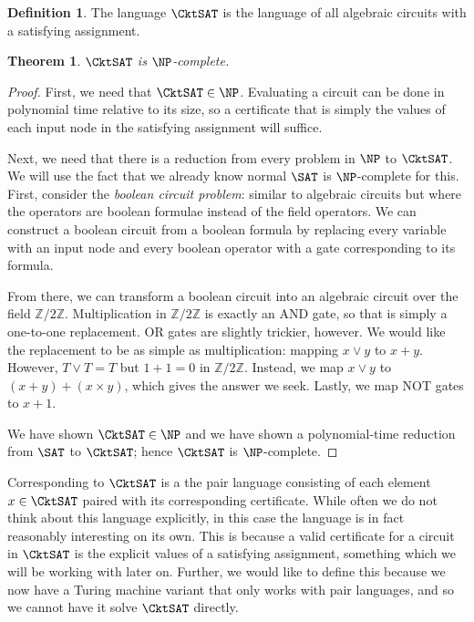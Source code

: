 \documentclass[english,12pt]{reedthesis}
\theoremstyle{plain}
\newtheorem{thm}{Theorem}[section]
\theoremstyle{definition}
\newtheorem{defn}[defn]{Definition}
\theoremstyle{remark}
\begin{document}
\begin{defn}\label{def:cktsat}
  The language $\CktSAT$ is the language of all algebraic circuits with a
  satisfying assignment.
\end{defn}

\begin{thm}\label{thm:cktsat-np-complete}
  $\CktSAT$ is $\NP$-complete.
\end{thm}

\begin{proof}
  First, we need that $\CktSAT \in \NP$. Evaluating a circuit can be done in
  polynomial time relative to its size, so a certificate that is simply the
  values of each input node in the satisfying assignment will suffice.

  Next, we need that there is a reduction from every problem in $\NP$ to
  $\CktSAT$. We will use the fact that we already know normal $\SAT$ is
  $\NP$-complete for this. First, consider the \emph{boolean circuit problem}:
  similar to algebraic circuits but where the operators are boolean formulae
  instead of the field operators. We can construct a boolean circuit from a
  boolean formula by replacing every variable with an input node and every
  boolean operator with a gate corresponding to its formula.

  From there, we can transform a boolean circuit into an algebraic circuit over
  the field $\mathbb{Z}/2\mathbb{Z}$. Multiplication in $\mathbb{Z}/2\mathbb{Z}$ is exactly an AND gate, so that is
  simply a one-to-one replacement. OR gates are slightly trickier, however. We
  would like the replacement to be as simple as multiplication: mapping $x \vee y$
  to $x + y$. However, $T \vee T = T$ but $1 + 1 = 0$ in $\mathbb{Z}/2\mathbb{Z}$. Instead, we map
  $x \vee y$ to $(x + y) + (x \times y)$, which gives the answer we seek. Lastly, we map
  NOT gates to $x + 1$.

  We have shown $\CktSAT \in \NP$ and we have shown a polynomial-time reduction
  from $\SAT$ to $\CktSAT$; hence $\CktSAT$ is $\NP$-complete.
\end{proof}

Corresponding to $\CktSAT$ is a the pair language consisting of each element
$x \in \CktSAT$ paired with its corresponding certificate. While often we do not
think about this language explicitly, in this case the language is in fact
reasonably interesting on its own. This is because a valid certificate for a
circuit in $\CktSAT$ is the explicit values of a satisfying assignment,
something which we will be working with later on. Further, we would like to
define this because we now have a Turing machine variant that only works with
pair languages, and so we cannot have it solve $\CktSAT$ directly.
\end{document}
